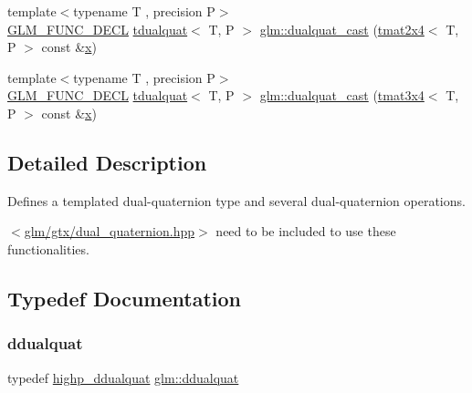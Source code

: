 \begin{DoxyCompactItemize}
\item 
{\footnotesize template$<$typename T , precision P$>$ }\\\mbox{\hyperlink{setup_8hpp_ab2d052de21a70539923e9bcbf6e83a51}{G\+L\+M\+\_\+\+F\+U\+N\+C\+\_\+\+D\+E\+CL}} \mbox{\hyperlink{structglm_1_1tdualquat}{tdualquat}}$<$ T, P $>$ \mbox{\hyperlink{group__gtx__dual__quaternion_gada9799afe2b62394dc498534beb5bc78}{glm\+::dualquat\+\_\+cast}} (\mbox{\hyperlink{structglm_1_1tmat2x4}{tmat2x4}}$<$ T, P $>$ const \&\mbox{\hyperlink{glad_8h_a92d0386e5c19fb81ea88c9f99644ab1d}{x}})
\item 
{\footnotesize template$<$typename T , precision P$>$ }\\\mbox{\hyperlink{setup_8hpp_ab2d052de21a70539923e9bcbf6e83a51}{G\+L\+M\+\_\+\+F\+U\+N\+C\+\_\+\+D\+E\+CL}} \mbox{\hyperlink{structglm_1_1tdualquat}{tdualquat}}$<$ T, P $>$ \mbox{\hyperlink{group__gtx__dual__quaternion_ga20eb5758beb73cc6dbc2d9104f03ec20}{glm\+::dualquat\+\_\+cast}} (\mbox{\hyperlink{structglm_1_1tmat3x4}{tmat3x4}}$<$ T, P $>$ const \&\mbox{\hyperlink{glad_8h_a92d0386e5c19fb81ea88c9f99644ab1d}{x}})
\end{DoxyCompactItemize}


\subsection{Detailed Description}
Defines a templated dual-\/quaternion type and several dual-\/quaternion operations. 

$<$\mbox{\hyperlink{dual__quaternion_8hpp}{glm/gtx/dual\+\_\+quaternion.\+hpp}}$>$ need to be included to use these functionalities. 

\subsection{Typedef Documentation}
\mbox{\label{group__gtx__dual__quaternion_ga373431ffdd82d5c03c258217a9e1f1a6}} 
\subsubsection{\texorpdfstring{ddualquat}{ddualquat}}
{\footnotesize\ttfamily typedef \mbox{\hyperlink{group__gtx__dual__quaternion_ga83e4c5d27c8b0a264a3f3aed24f3f84e}{highp\+\_\+ddualquat}} \mbox{\hyperlink{group__gtx__dual__quaternion_ga373431ffdd82d5c03c258217a9e1f1a6}{glm\+::ddualquat}}}

